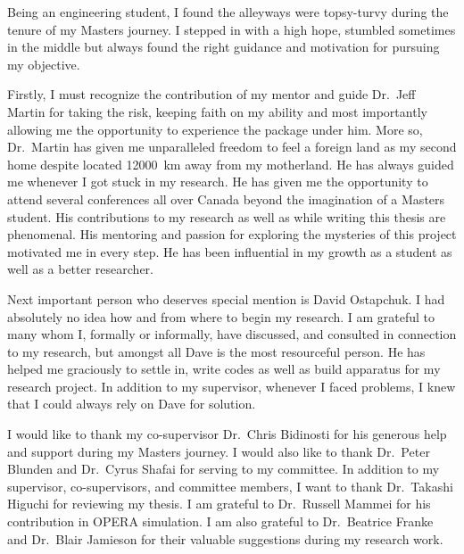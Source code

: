 \newpage
\tableofcontents
{}
\listoffigures
\listoftables

\begin{acknowledgments}
\vspace{2em}

Being an engineering student, I found the alleyways were topsy-turvy during the tenure of my Masters journey. I stepped in with a high hope, stumbled sometimes in the middle but always found the right guidance and motivation for pursuing my objective. 

Firstly, I must recognize the contribution of my mentor and guide Dr.~Jeff Martin for taking the risk, keeping faith on my ability and most importantly allowing me the opportunity to experience the package under him. More so, Dr.~Martin has given me unparalleled freedom to feel a foreign land as my second home despite located 12000~km away from my motherland. He has always guided me whenever I got stuck in my research. He has given me the opportunity to attend several conferences all over Canada beyond the imagination of a Masters student. His contributions to my research as well as while writing this thesis are phenomenal. His mentoring and passion for exploring the mysteries of this project motivated me in every step. He has been influential in my growth as a student as well as a better researcher.  



Next important person who deserves special mention is David Ostapchuk. I had absolutely no idea how and from where to begin my research. I am grateful to many whom I, formally or informally, have discussed, and consulted in connection to my research, but amongst all Dave is the most resourceful person. He has helped me graciously to settle in, write codes as well as build apparatus for my research project. In addition to my supervisor, whenever I faced problems, I knew that I could always rely on Dave for solution.


I would like to thank my co-supervisor Dr.~Chris Bidinosti for his generous help and support during my Masters journey. I would also like to thank Dr.~Peter Blunden and Dr.~Cyrus Shafai for serving to my committee. In addition to my supervisor, co-supervisors, and committee members, I want to thank Dr.~Takashi Higuchi for reviewing my thesis. I am grateful to Dr.~Russell Mammei for his contribution in OPERA simulation. I am also grateful to Dr.~Beatrice Franke and Dr.~Blair Jamieson for their valuable suggestions during my research work. 



\end{acknowledgments}

